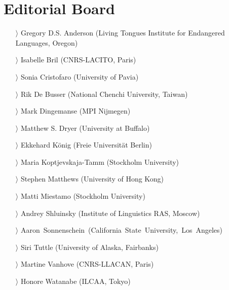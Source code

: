 \documentclass[
notumble,
nofoldmark,
]{leaflet}
\begin{document}
{    \section{Editorial Board}
    \begin{itemize}
    \item[$\rangle$] Gregory D.S. Anderson (Living Tongues Institute for Endangered Languages, Oregon)
    \item[$\rangle$] Isabelle Bril (CNRS-LACITO, Paris)
    \item[$\rangle$] Sonia Cristofaro (University of Pavia)
    \item[$\rangle$] Rik De Busser (National Chenchi University, Taiwan)
    \item[$\rangle$] Mark Dingemanse (MPI Nijmegen)
    \item[$\rangle$] Matthew S. Dryer (University at Buffalo)
    \item[$\rangle$] Ekkehard K\"onig (Freie Universit\"at Berlin)
    \item[$\rangle$] Maria Koptjevskaja-Tamm (Stockholm University)
    \item[$\rangle$] Stephen Matthews (University of Hong Kong)
    \item[$\rangle$] Matti Miestamo (Stockholm University)
    \item[$\rangle$] Andrey Shluinsky (Institute of Linguistics RAS, Moscow)
    \item[$\rangle$] \mbox{Aaron Sonnenschein (California State University, Los Angeles)}
    \item[$\rangle$] Siri Tuttle (University of Alaska, Fairbanks)
    \item[$\rangle$] Martine Vanhove (CNRS-LLACAN, Paris)
    \item[$\rangle$] Honore Watanabe (ILCAA, Tokyo)
    \end{itemize}    
}
\end{document}
